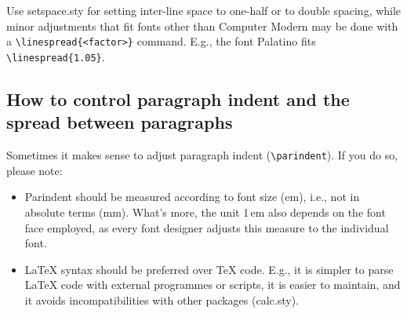 \documentclass[abstract=on, singlepage=on, paper=a4]{scrartcl}
\newcommand{\Command}[1]{\texttt{\textbackslash{}#1}}
\newcommand{\Package}[1]{\textsf{#1}}
\begin{document}
Use \Package{setspace.sty} for setting inter-line space to one-half or
to double spacing, while minor adjustments that fit fonts other than
Computer Modern may be done with a \Command{linespread\{<factor>\}}
command. E.g., the font Palatino fits \Command{linespread\{1.05\}}.

\subsection{How to control paragraph indent and the spread between
  paragraphs}
\label{sec:control-paragr}

Sometimes it makes sense to adjust paragraph indent
(\Command{parindent}). If you do so, please note:
\begin{itemize}
\item Parindent should be measured according to font size (em), i.e.,
  not in absolute terms (mm). What's more, the unit 1\,em also depends
  on the font face employed, as every font designer adjusts this
  measure to the individual font.
\item \LaTeX{} syntax should be preferred over \TeX{} code. E.g., it
  is simpler to parse \LaTeX{} code with external programmes or
  scripts, it is easier to maintain, and it avoids incompatibilities
  with other packages (\Package{calc.sty}).
\end{itemize}

\printbibliography
\end{document}
